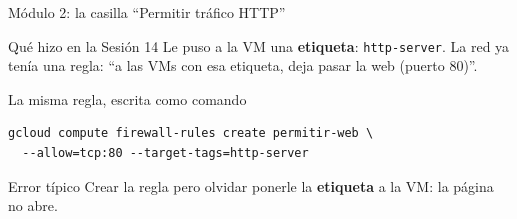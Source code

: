 \documentclass[aspectratio=169,10pt,c]{beamer}
\begin{document}
\begin{frame}[fragile]{Módulo 2: la casilla ``Permitir tráfico HTTP''}
\begin{block}{Qué hizo en la Sesión 14}
\small Le puso a la VM una \textbf{etiqueta}: \texttt{http-server}. La red ya tenía una regla: ``a las VMs con esa etiqueta, deja pasar la web (puerto 80)''.
\end{block}
\begin{center}
\end{center}
\begin{exampleblock}{La misma regla, escrita como comando}
\begin{lstlisting}[basicstyle=\ttfamily\footnotesize]
gcloud compute firewall-rules create permitir-web \
  --allow=tcp:80 --target-tags=http-server
\end{lstlisting}
\end{exampleblock}
\begin{alertblock}{Error típico}
\small Crear la regla pero olvidar ponerle la \textbf{etiqueta} a la VM: la página no abre.
\end{alertblock}
\end{frame}
\end{document}
